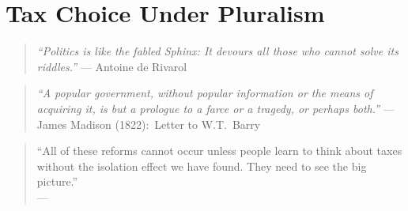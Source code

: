
\chapter[Tax Choice Under Pluralism]{Tax Choice Under Pluralism} \label{chap:tax-under-pluralism}



\begin{quote}
	\emph{``Politics is like the fabled Sphinx:
It devours all those who cannot solve its riddles.''}
	--- Antoine de Rivarol
\end{quote}

\begin{quote}
	\emph{``A popular government, without popular information or the means of acquiring it, is but a prologue to a farce or a tragedy, or perhaps both.''}
	--- James Madison (1822):\ Letter to W.T.~Barry
\end{quote}

\begin{quote}
	``All of these reforms cannot occur unless people learn to think about taxes without the isolation effect we have found.
They need to see the big picture.''\\
	--- \cite[ 23]{McCaffery2003}
\end{quote}





